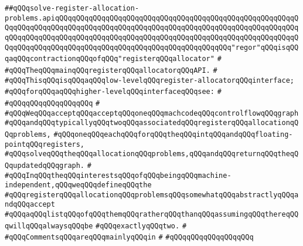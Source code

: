 \label{src/lib/compiler/back/low/regor/solve-register-allocation-problems.api}
\verb|##qQQqsolve-register-allocation-problems.apiqQQqqQQqqQQqqQQqqQQqqQQqqQQqqQQqqQQqqQQqqQQqqQQqqQQqqQQqqQQqqQQqqQQqqQQqqQQqqQQqqQQqqQQqqQQqqQQqqQQqqQQqqQQqqQQqqQQqqQQqqQQqqQQqqQQqqQQqqQQqqQQqqQQqqQQqqQQqqQQqqQQqqQQqqQQqqQQqqQQqqQQqqQQqqQQqqQQqqQQqqQQqqQQqqQQqqQQqqQQqqQQqqQQqqQQqqQQqqQQqqQQqqQQqqQQq"regor"qQQqisqQQqaqQQqcontractionqQQqofqQQq"registerqQQqallocator"|\newline
\verb|#|\newline
\verb|#qQQqTheqQQqmainqQQqregisterqQQqallocatorqQQqAPI.|\newline
\verb|#|\newline
\verb|#qQQqThisqQQqisqQQqaqQQqlow-levelqQQqregister-allocatorqQQqinterface;|\newline
\verb|#qQQqforqQQqaqQQqhigher-levelqQQqinterfaceqQQqsee:|\newline
\verb|#|\newline
\verb|#qQQqqQQqqQQqqQQqqQQq|\newline
\verb|#|\newline
\verb|#qQQqWeqQQqacceptqQQqacceptqQQqoneqQQqmachcodeqQQqcontrolflowqQQqgraph|\newline
\verb|#qQQqandqQQqtypicallyqQQqtwoqQQqassociatedqQQqregisterqQQqallocationqQQqproblems,|\newline
\verb|#qQQqoneqQQqeachqQQqforqQQqtheqQQqintqQQqandqQQqfloating-pointqQQqregisters,|\newline
\verb|#qQQqsolveqQQqtheqQQqallocationqQQqproblems,qQQqandqQQqreturnqQQqtheqQQqupdatedqQQqgraph.|\newline
\verb|#|\newline
\verb|#qQQqInqQQqtheqQQqinterestsqQQqofqQQqbeingqQQqmachine-independent,qQQqweqQQqdefineqQQqthe|\newline
\verb|#qQQqregisterqQQqallocationqQQqproblemsqQQqsomewhatqQQqabstractlyqQQqandqQQqaccept|\newline
\verb|#qQQqaqQQqlistqQQqofqQQqthemqQQqratherqQQqthanqQQqassumingqQQqthereqQQqwillqQQqalwaysqQQqbe|\newline
\verb|#qQQqexactlyqQQqtwo.|\newline
\verb|#|\newline
\verb|#qQQqCommentsqQQqareqQQqmainlyqQQqin|\newline
\verb|#|\newline
\verb|#qQQqqQQqqQQqqQQqqQQq|\newline
